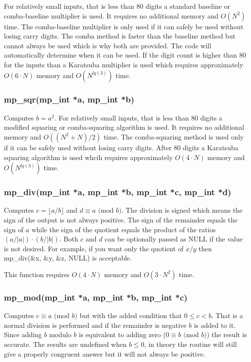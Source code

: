 \documentclass{article}
\begin{document}
For relatively small inputs, that is less than 80 digits a standard baseline or comba-baseline multiplier is used.  It
requires no additional memory and $O(N^2)$ time.  The comba-baseline multiplier is only used if it can safely be used
without losing carry digits.  The comba method is faster than the baseline method but cannot always be used which is why
both are provided.  The code will automatically determine when it can be used.  If the digit count is higher
than 80 for the inputs than a Karatsuba multiplier is used which requires approximately $O(6 \cdot N)$ memory and 
$O(N^{lg(3)})$ time.  

\subsubsection{mp\_sqr(mp\_int *a, mp\_int *b)}
Computes $b = a^2$. 
For relatively small inputs, that is less than 80 digits a modified squaring or comba-squaring algorithm is used.  It
requires no additional memory and $O((N^2 + N)/2)$ time.  The comba-squaring method is used only if it can be safely used
without losing carry digits.  After 80 digits a Karatsuba squaring algorithm is used whcih requires approximately 
$O(4 \cdot N)$ memory and $O(N^{lg(3)})$ time.

\subsubsection{mp\_div(mp\_int *a, mp\_int *b, mp\_int *c, mp\_int *d)}
Computes $c = \lfloor a/b \rfloor$ and $d \equiv a \mbox{ (mod }b\mbox{)}$.  The division is signed which means the sign
of the output is not always positive.  The sign of the remainder equals the sign of $a$ while the sign of the 
quotient equals the product of the ratios $(a/\vert a \vert) \cdot (b/\vert b \vert)$.  Both $c$ and $d$ can be 
optionally passed as NULL if the value is not desired.  For example, if you want only the quotient of $x/y$ then 
mp\_div(\&x, \&y, \&z, NULL) is acceptable.

This function requires $O(4 \cdot N)$ memory and $O(3 \cdot N^2)$ time.

\subsubsection{mp\_mod(mp\_int *a, mp\_int *b, mp\_int *c)}
Computes $c \equiv a \mbox{ (mod }b\mbox{)}$ but with the added condition that $0 \le c < b$.  That is a normal 
division is performed and if the remainder is negative $b$ is added to it.  Since adding $b$ modulo $b$ is equivalent
to adding zero ($0 \equiv b \mbox{ (mod }b\mbox{)}$) the result is accurate.  The results are undefined 
when $b \le 0$, in theory the routine will still give a properly congruent answer but it will not always be positive. 
\end{document}
